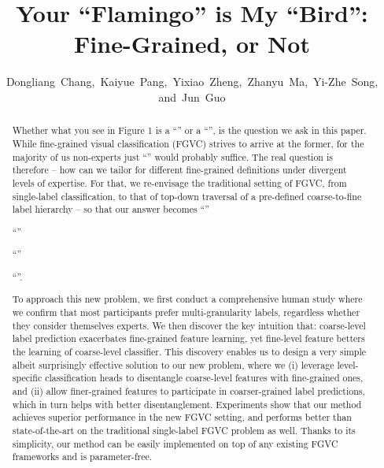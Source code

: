 \documentclass[final]{cvpr}
\begin{document}
\title{Your ``Flamingo'' is My ``Bird'': Fine-Grained, or Not}

\author{Dongliang~Chang,~Kaiyue~Pang,~Yixiao~Zheng,~Zhanyu~Ma,~Yi-Zhe~Song, and~Jun~Guo}  




\maketitle


\begin{abstract}
Whether what you see in Figure 1 is a ``'' or a ``'', is the question we ask in this paper. While fine-grained visual classification (FGVC) strives to arrive at the former, for the majority of us non-experts just ``'' would probably suffice. The real question is therefore -- how can we tailor for different fine-grained definitions under divergent levels of expertise. For that, we re-envisage the traditional setting of FGVC, from single-label classification, to that of top-down traversal of a pre-defined coarse-to-fine label hierarchy -- so that our answer becomes ``'' 
 
``'' 
 
``''

``''. 

To approach this new problem, we first conduct a comprehensive human study where we confirm that most participants prefer multi-granularity labels, regardless whether they consider themselves experts. We then discover the key intuition that: coarse-level label prediction exacerbates fine-grained feature learning, yet fine-level feature betters the learning of coarse-level classifier. This discovery enables us to design a very simple albeit surprisingly effective solution to our new problem, where we (i) leverage level-specific classification heads to disentangle coarse-level features with fine-grained ones, and (ii) allow finer-grained features to participate in coarser-grained label predictions, which in turn helps with better disentanglement. Experiments show that our method achieves superior performance in the new FGVC setting, and performs better than state-of-the-art on the traditional single-label FGVC problem as well. Thanks to its simplicity, our method can be easily implemented on top of any existing FGVC frameworks and is parameter-free. 

\end{abstract}
\end{document}
